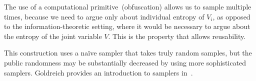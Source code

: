 \documentclass[11pt]{article}
\newcommand{\consref}[1]{\mbox{Construction~\ref{#1}}}
\newcommand{\Huse}{\mathrm{H}_{\mathtt{usable}}}
\begin{document}
\noindent
The use of a computational primitive~(obfuscation) allows us to sample multiple times, because we need to argue only about individual entropy of $V_i$, as opposed to the information-theoretic setting, where it would be necessary to argue about the entropy of the joint variable $V$.  This is the property that allows reusability.

This construction uses a na\"{i}ve sampler that takes truly random samples, but the public randomness may be substantially decreased by using more sophisticated samplers. Goldreich provides an introduction to samplers in~\cite{goldreich2011sample}.
\end{document}
